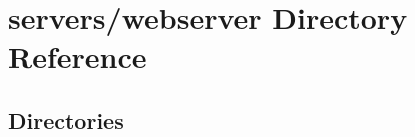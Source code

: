 \section{servers/webserver Directory Reference}
\label{dir_13e2245166e84f6ec1646b31644838ca}
\subsection*{Directories}
\begin{DoxyCompactItemize}
\end{DoxyCompactItemize}
